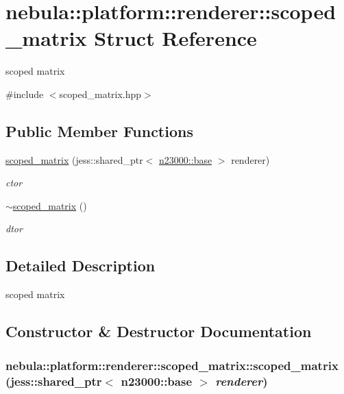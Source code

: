 \hypertarget{structnebula_1_1platform_1_1renderer_1_1scoped__matrix}{
\section{nebula::platform::renderer::scoped\_\-matrix Struct Reference}
\label{structnebula_1_1platform_1_1renderer_1_1scoped__matrix}
}


scoped matrix  


{\ttfamily \#include $<$scoped\_\-matrix.hpp$>$}\subsection*{Public Member Functions}
\begin{DoxyCompactItemize}
\item 
\hyperlink{structnebula_1_1platform_1_1renderer_1_1scoped__matrix_ab21b4edb1a3886c789dfd25ece961bc6}{scoped\_\-matrix} (jess::shared\_\-ptr$<$ \hyperlink{classnebula_1_1platform_1_1renderer_1_1base}{n23000::base} $>$ renderer)
\begin{DoxyCompactList}\small\item\em ctor \item\end{DoxyCompactList}\item 
\hyperlink{structnebula_1_1platform_1_1renderer_1_1scoped__matrix_aea3c017adec05d7c3955c2ff79d06d87}{$\sim$scoped\_\-matrix} ()
\begin{DoxyCompactList}\small\item\em dtor \item\end{DoxyCompactList}\end{DoxyCompactItemize}


\subsection{Detailed Description}
scoped matrix 

\subsection{Constructor \& Destructor Documentation}
\hypertarget{structnebula_1_1platform_1_1renderer_1_1scoped__matrix_ab21b4edb1a3886c789dfd25ece961bc6}{
\subsubsection[{scoped\_\-matrix}]{\setlength{\rightskip}{0pt plus 5cm}nebula::platform::renderer::scoped\_\-matrix::scoped\_\-matrix (jess::shared\_\-ptr$<$ {\bf n23000::base} $>$ {\em renderer})}}
\label{structnebula_1_1platform_1_1renderer_1_1scoped__matrix_ab21b4edb1a3886c789dfd25ece961bc6}


